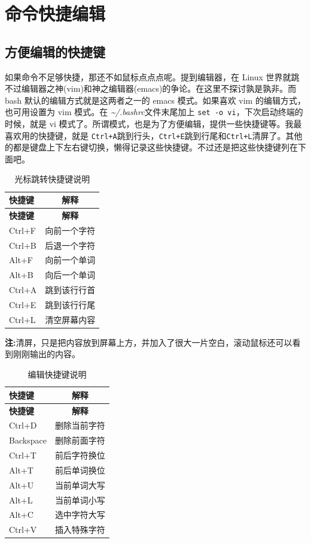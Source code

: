 \documentclass[doctor,openright,twoside]{sjtuthesis}
\newcommand{\passthrough}[1]{#1}
\theoremstyle{plain}
\theoremstyle{definition}
\theoremstyle{remark}
\theoremstyle{ocrenumbox}
\theoremstyle{plain}
\begin{document}
\section{命令快捷编辑}

\subsection{方便编辑的快捷键}

如果命令不足够快捷，那还不如鼠标点点点呢。提到编辑器，在 Linux
世界就跳不过编辑器之神(vim)和神之编辑器(emacs)的争论。在这里不探讨孰是孰非。而
bash 默认的编辑方式就是这两者之一的 emacs 模式。如果喜欢 vim
的编辑方式，也可用设置为 vim 模式。在
\emph{\textasciitilde{}/.bashrc}文件末尾加上
\passthrough{\lstinline!set -o vi!}，下次启动终端的时候，就是 vi
模式了。所谓模式，也是为了方便编辑，提供一些快捷键等。我最喜欢用的快捷键，就是
\passthrough{\lstinline!Ctrl+A!}跳到行头，\passthrough{\lstinline!Ctrl+E!}跳到行尾和\passthrough{\lstinline!Ctrl+L!}清屏了。其他的都是键盘上下左右键切换，懒得记录这些快捷键。不过还是把这些快捷键列在下面吧。

\begin{longtable}[]{@{}lc@{}}
\caption{光标跳转快捷键说明\label{tab:cmd:skip-shortkey}}\tabularnewline
\toprule
\textbf{快捷键} & \textbf{解释}\tabularnewline
\midrule
\endfirsthead
\toprule
\textbf{快捷键} & \textbf{解释}\tabularnewline
\midrule
\endhead
Ctrl+F & 向前一个字符\tabularnewline
Ctrl+B & 后退一个字符\tabularnewline
Alt+F & 向前一个单词\tabularnewline
Alt+B & 向后一个单词\tabularnewline
Ctrl+A & 跳到该行行首\tabularnewline
Ctrl+E & 跳到该行行尾\tabularnewline
Ctrl+L & 清空屏幕内容\tabularnewline
\bottomrule
\end{longtable}

\textbf{注:}清屏，只是把内容放到屏幕上方，并加入了很大一片空白，滚动鼠标还可以看到刚刚输出的内容。

\begin{longtable}[]{@{}lc@{}}
\caption{编辑快捷键说明\label{tab:cmd:edit-shortkey}}\tabularnewline
\toprule
\textbf{快捷键} & \textbf{解释}\tabularnewline
\midrule
\endfirsthead
\toprule
\textbf{快捷键} & \textbf{解释}\tabularnewline
\midrule
\endhead
Ctrl+D & 删除当前字符\tabularnewline
Backspace & 删除前面字符\tabularnewline
Ctrl+T & 前后字符换位\tabularnewline
Alt+T & 前后单词换位\tabularnewline
Alt+U & 当前单词大写\tabularnewline
Alt+L & 当前单词小写\tabularnewline
Alt+C & 选中字符大写\tabularnewline
Ctrl+V & 插入特殊字符\tabularnewline
\bottomrule
\end{longtable}
\end{document}

